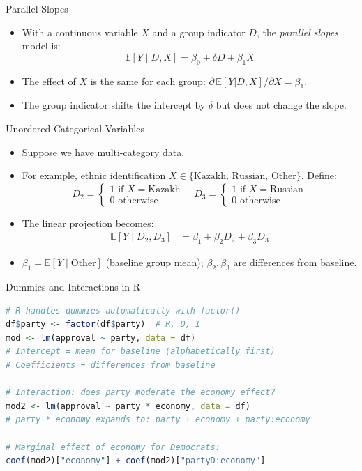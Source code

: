 \documentclass[aspectratio=169]{beamer}
\numberwithin{equation}{section}
\begin{document}
\begin{frame}{Parallel Slopes}
\begin{itemize}
\item With a continuous variable $X$ and a group indicator $D$, the \emph{parallel slopes} model is:
$$\mathbb{E}[Y \mid D, X] = \beta_0 + \delta D + \beta_1 X$$
\pause
\item The effect of $X$ is the same for each group: $\partial\, \mathbb{E}[Y|D,X]/\partial X = \beta_1$.
\item The group indicator shifts the intercept by $\delta$ but does not change the slope.
\end{itemize}
\end{frame}


\begin{frame}{Unordered Categorical Variables}
\begin{itemize}
\item Suppose we have multi-category data.
\item For example, ethnic identification $X\in \{ \text{Kazakh, Russian, Other}\}$.  Define:
$$D_{2}=\begin{cases} 1 \text{ if } X=\text{Kazakh} \\ 0 \text{ otherwise}\end{cases} \quad D_{3}=\begin{cases} 1 \text{ if } X=\text{Russian}\\ 0 \text{ otherwise} \end{cases}$$
\item The linear projection becomes:
\begin{align*}
\mathbb{E}[Y \mid D_2, D_3] &= \beta_1 + \beta_2 D_{2} + \beta_3 D_{3}
\end{align*}
\item $\beta_1 = \mathbb{E}[Y \mid \text{Other}]$ (baseline group mean); $\beta_2, \beta_3$ are differences from baseline.

\end{itemize}
\end{frame}

\begin{frame}[fragile]{Dummies and Interactions in R}
\begin{lstlisting}[language=R]
# R handles dummies automatically with factor()
df$party <- factor(df$party)  # R, D, I
mod <- lm(approval ~ party, data = df)
# Intercept = mean for baseline (alphabetically first)
# Coefficients = differences from baseline

# Interaction: does party moderate the economy effect?
mod2 <- lm(approval ~ party * economy, data = df)
# party * economy expands to: party + economy + party:economy

# Marginal effect of economy for Democrats:
coef(mod2)["economy"] + coef(mod2)["partyD:economy"]
\end{lstlisting}
\end{frame}
\end{document}
